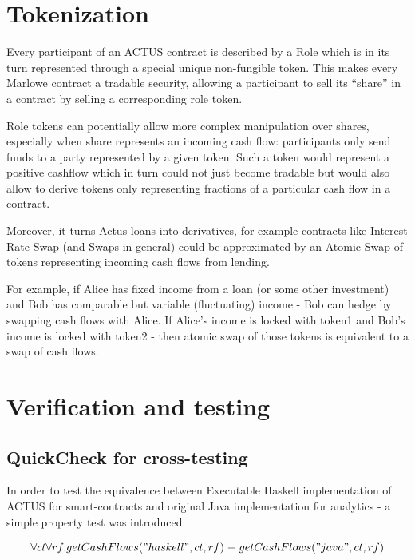\documentclass[runningheads]{llncs}
\begin{document}
\section{Tokenization}
\label{tokenization}

Every participant of an ACTUS contract is described by a Role which
is in its turn represented through a special unique non-fungible token.
This makes every Marlowe contract a tradable security, allowing a
participant to sell its ``share'' in a contract by selling a corresponding
role token.

Role tokens can potentially allow more complex manipulation over shares,
especially when share represents an incoming cash flow: participants
only send funds to a party represented by a given token. Such a token
would represent a positive cashflow which in turn could not just become
tradable but would also allow to derive tokens only representing fractions
of a particular cash flow in a contract.

Moreover, it turns Actus-loans into derivatives, for example contracts
like Interest Rate Swap (and Swaps in general) could be approximated
by an Atomic Swap of tokens representing incoming cash flows from
lending.

For example, if Alice has fixed income from a loan (or some other
investment) and Bob has comparable but variable (fluctuating) income
- Bob can hedge by swapping cash flows with Alice. If Alice's income
is locked with token1 and Bob's income is locked with token2 - then
atomic swap of those tokens is equivalent to a swap of cash flows.

\section{Verification and testing}
\label{verification}

\subsection{QuickCheck for cross-testing}

In order to test the equivalence between Executable Haskell implementation
of ACTUS for smart-contracts and original Java implementation for
analytics - a simple property test was introduced:

\smallskip
\noindent 
\begin{equation}
\forall ct\forall rf.getCashFlows("haskell",ct,rf)\equiv getCashFlows("java",ct,rf)
\end{equation}
\end{document}
